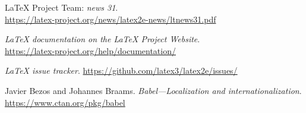 \documentclass{ltnews}
\begin{document}
\medskip
\begin{thebibliography}{9}

\fontsize{9.3}{11.3}\selectfont

 \LaTeX{} Project Team:
  \emph{\LaTeXe{} news 31}.\\
  \url{https://latex-project.org/news/latex2e-news/ltnews31.pdf}

  \emph{\LaTeX{} documentation on the \LaTeX{} Project Website}.\\
  \url{https://latex-project.org/help/documentation/}

  \emph{\LaTeX{} issue tracker}.
  \url{https://github.com/latex3/latex2e/issues/}

  Javier Bezos and Johannes Braams.
  \emph{Babel---Localization and internationalization}.\\
  \url{https://www.ctan.org/pkg/babel}

\end{thebibliography}
\end{document}
